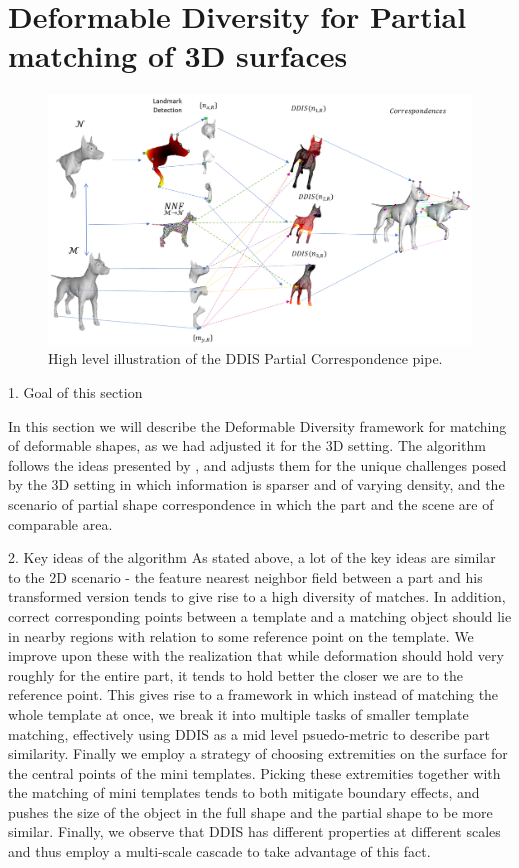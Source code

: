 \documentclass[10pt,twocolumn,letterpaper]{article}
\begin{document}
\section{Deformable Diversity for Partial matching of 3D surfaces}\label{sec:algorithm}
\begin{figure}[htb]
	\centering
	\includegraphics[width=1\textwidth]{figures/Birds_Flight.png}
	\caption{High level illustration of the DDIS Partial Correspondence pipe.}
\end{figure}

{\color{red}
	
	1. Goal of this section
}
In this section we will describe the Deformable Diversity framework for matching of deformable shapes, as we had adjusted it for the 3D setting.
The algorithm follows the ideas presented by \cite{talmi2017template}, and adjusts them for the unique challenges posed by the 3D setting in which information is sparser and of varying density, and the scenario of partial shape correspondence in which the part and the scene are of comparable area.

{\color{red}
	2. Key ideas of the algorithm
}
As stated above, a lot of the key ideas are similar to the 2D scenario - the feature nearest neighbor field between a part and his transformed version tends to give rise to a high diversity of matches.
In addition, correct corresponding points between a template and a matching object should lie in nearby regions with relation to some reference point on the template.
We improve upon these with the realization that while deformation should hold very roughly for the entire part, it tends to hold better the closer we are to the reference point. This gives rise to a framework in which instead of matching the whole template at once, we break it into multiple tasks of smaller template matching, effectively using DDIS as a mid level psuedo-metric to describe part similarity.
Finally we employ a strategy of choosing extremities on the surface for the central points of the mini templates. Picking these extremities together with the matching of mini templates tends to both mitigate boundary effects, and pushes the size of the object in the full shape and the partial shape to be more similar.
Finally, we observe that DDIS has different properties at different scales and thus employ a multi-scale cascade to take advantage of this fact.
\end{document}
